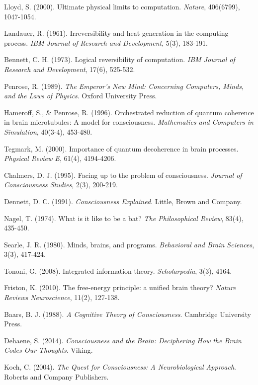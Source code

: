 \documentclass{article}
\begin{document}
\begin{thebibliography}{99}
Lloyd, S. (2000). Ultimate physical limits to computation. \textit{Nature}, 406(6799), 1047-1054.

Landauer, R. (1961). Irreversibility and heat generation in the computing process. \textit{IBM Journal of Research and Development}, 5(3), 183-191.

Bennett, C. H. (1973). Logical reversibility of computation. \textit{IBM Journal of Research and Development}, 17(6), 525-532.

Penrose, R. (1989). \textit{The Emperor's New Mind: Concerning Computers, Minds, and the Laws of Physics}. Oxford University Press.

Hameroff, S., \& Penrose, R. (1996). Orchestrated reduction of quantum coherence in brain microtubules: A model for consciousness. \textit{Mathematics and Computers in Simulation}, 40(3-4), 453-480.

Tegmark, M. (2000). Importance of quantum decoherence in brain processes. \textit{Physical Review E}, 61(4), 4194-4206.

Chalmers, D. J. (1995). Facing up to the problem of consciousness. \textit{Journal of Consciousness Studies}, 2(3), 200-219.

Dennett, D. C. (1991). \textit{Consciousness Explained}. Little, Brown and Company.

Nagel, T. (1974). What is it like to be a bat? \textit{The Philosophical Review}, 83(4), 435-450.

Searle, J. R. (1980). Minds, brains, and programs. \textit{Behavioral and Brain Sciences}, 3(3), 417-424.

Tononi, G. (2008). Integrated information theory. \textit{Scholarpedia}, 3(3), 4164.

Friston, K. (2010). The free-energy principle: a unified brain theory? \textit{Nature Reviews Neuroscience}, 11(2), 127-138.

Baars, B. J. (1988). \textit{A Cognitive Theory of Consciousness}. Cambridge University Press.

Dehaene, S. (2014). \textit{Consciousness and the Brain: Deciphering How the Brain Codes Our Thoughts}. Viking.

Koch, C. (2004). \textit{The Quest for Consciousness: A Neurobiological Approach}. Roberts and Company Publishers.


\end{thebibliography}
\end{document}
